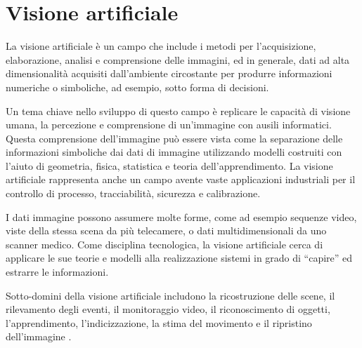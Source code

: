\chapter{Visione artificiale}

La visione artificiale è un campo che include i metodi per l'acquisizione, elaborazione, analisi e comprensione delle immagini, ed in generale, dati ad alta dimensionalità acquisiti dall'ambiente circostante per produrre informazioni numeriche o simboliche, ad esempio, sotto forma di decisioni.

Un tema chiave nello sviluppo di questo campo è replicare le capacità di visione umana, la percezione e comprensione di un'immagine con ausili informatici. Questa comprensione dell'immagine può essere vista come la separazione delle informazioni simboliche dai dati di immagine utilizzando modelli costruiti con l'aiuto di geometria, fisica, statistica e teoria dell'apprendimento. La visione artificiale rappresenta anche un campo avente vaste applicazioni industriali per il controllo di processo, tracciabilità, sicurezza e calibrazione.

I dati immagine possono assumere molte forme, come ad esempio sequenze video, viste della stessa scena da più telecamere, o dati multidimensionali da uno scanner medico. Come disciplina tecnologica, la visione artificiale cerca di applicare le sue teorie e modelli alla realizzazione sistemi in grado di ``capire'' ed estrarre le informazioni.

Sotto-domini della visione artificiale includono la ricostruzione delle scene, il rilevamento degli eventi, il monitoraggio video, il riconoscimento di oggetti, l'apprendimento, l'indicizzazione, la stima del movimento  e il ripristino dell'immagine .


\endinput